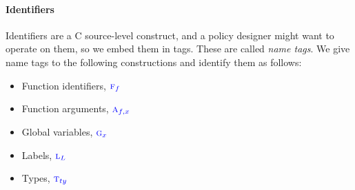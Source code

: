 \documentclass{llncs}
\begin{document}
\paragraph*{Identifiers}

Identifiers are a C source-level construct, and a policy designer might want to operate on them,
so we embed them in tags. These are called {\em name tags}. We give name tags to the
following constructions and identify them as follows:
\begin{itemize}
\item Function identifiers, \({\color{blue} \textnormal{\sc f}_{f}}\)
\item Function arguments, \({\color{blue} \textnormal{\sc a}_{f,x}}\)
\item Global variables, \({\color{blue} \textnormal{\sc g}_{x}}\)
\item Labels, \({\color{blue} \textnormal{\sc l}_{L}}\)
\item Types, \({\color{blue} \textnormal{\sc t}_{ty}}\)
\end{itemize}
\end{document}
